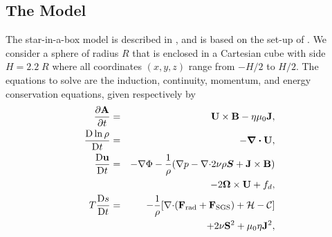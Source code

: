\documentclass[baaa]{baaa}
\begin{document}
\subsection{The Model}
The star-in-a-box model is described in \cite{model}, and is based on the set-up of \cite{dobler}. We consider a sphere of radius $R$ that is enclosed in a Cartesian cube with side $H = 2.2\; R$ where all coordinates $(x, y, z)$ range from $- H/2$ to $H/2$. The equations to solve are the induction, continuity, momentum, and energy conservation equations, given respectively by
\begin{eqnarray}
    \frac{\partial \mathbf{A}}{\partial t} &=& \textbf{U} \times \textbf{B} -\eta \mu_0 \mathbf{J},\\
    \frac{{\rm D}\ln{\rho}}{{\rm D}t} &=& -{\bm\nabla \bm\cdot {\bf U}},\\
    \frac{{\rm D}\bf{u}}{{\rm D}t} &=& -{\bf \nabla} \Phi -\frac{1}{\rho}({\bf \nabla} p-{\bf \nabla\cdot} 2\nu\rho {\bm S} + {\bf J} \times {\bf B})\nonumber \\
     && -2\bm\Omega\times {\bf U}+ f_d,\\
     T\frac{{\rm D}s}{{\rm D}t} &=& -\frac{1}{\rho}[{\bf \nabla \cdot} ({\bf{F}_{\textrm{rad}}} + {\bf F}_{\rm{SGS}}) + \mathcal{H} - \mathcal{C}]\nonumber \\
     && + 2\nu {\bf S}^2 +\mu_0 \eta {\bf J}^{2},
\end{eqnarray}
\end{document}
